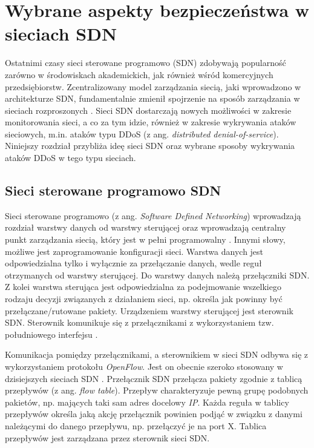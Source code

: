 \chapter{Wybrane aspekty bezpieczeństwa w sieciach SDN }

Ostatnimi czasy sieci sterowane programowo (SDN) zdobywają popularność zarówno
w środowiskach akademickich, jak również wśród komercyjnych przedsiębiorstw.
Zcentralizowany model zarządzania siecią, jaki wprowadzono w architekturze SDN,
fundamentalnie zmienił spojrzenie na sposób zarządzania w sieciach rozproszonych
\cite{ddosNYarticle}. Sieci SDN dostarczają nowych możliwości w zakresie
monitorowania sieci, a co za tym idzie, również w zakresie wykrywania ataków
sieciowych, m.in. ataków typu DDoS (z ang. \textit{distributed
  denial-of-service}). Niniejszy rozdział przybliża ideę sieci SDN oraz wybrane
sposoby wykrywania ataków DDoS w tego typu sieciach. 

\section{Sieci sterowane programowo SDN}
Sieci sterowane programowo (z ang. \textit{Software Defined Networking})
wprowadzają rozdział warstwy danych od warstwy sterującej oraz wprowadzają
centralny punkt zarządzania siecią, który jest w pełni programowalny \cite{onf}.
Innymi słowy, możliwe jest zaprogramowanie konfiguracji sieci. Warstwa danych
jest odpowiedzialna tylko i wyłącznie za przełączanie danych, wedle reguł
otrzymanych od warstwy sterującej. Do warstwy danych należą przełączniki SDN.
Z kolei warstwa sterująca jest odpowiedzialna za podejmowanie wszelkiego
rodzaju decyzji związanych z działaniem sieci, np. określa jak powinny być
przełączane/rutowane pakiety. Urządzeniem warstwy sterującej jest sterownik
SDN. Sterownik komunikuje się z przełącznikami z wykorzystaniem tzw.
południowego interfejsu \cite{sdninterfaces}.

Komunikacja pomiędzy przełącznikami, a sterownikiem w sieci SDN odbywa się z
wykorzystaniem protokołu \textit{OpenFlow}. Jest on obecnie szeroko stosowany w
dzisiejszych sieciach SDN \cite{ddoskoreaarticle}. Przełącznik SDN przełącza
pakiety zgodnie z tablicą przepływów (z ang. \textit{flow table}). Przepływ
charakteryzuje pewną grupę podobnych pakietów, np. mających taki sam adres
docelowy \textit{IP}. Każda reguła w tablicy przepływów określa jaką akcję
przełącznik powinien podjąć w związku z danymi należącymi do danego
przepływu, np. przełączyć je na port X. Tablica przepływów jest zarządzana przez
sterownik sieci SDN.

